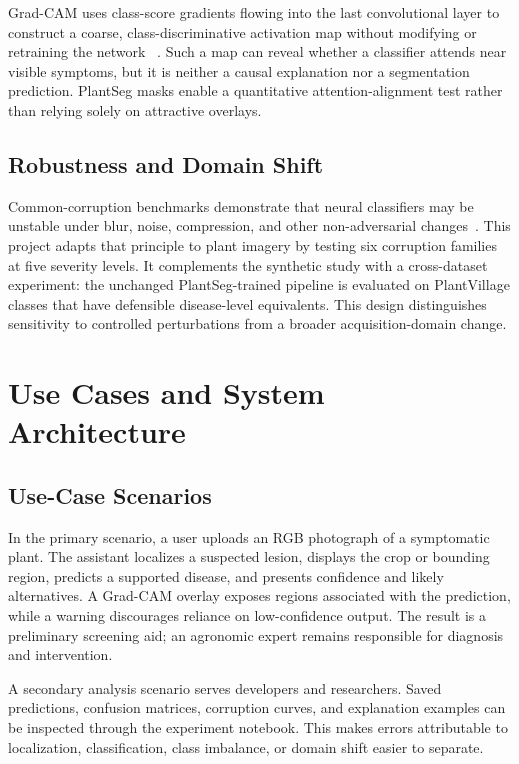 \documentclass[conference]{IEEEtran}
\begin{document}
Grad-CAM uses class-score gradients flowing into the last convolutional layer to construct a coarse,
class-discriminative activation map without modifying or retraining the network
~\cite{selvaraju2017gradcam}. Such a map can reveal whether a classifier attends near visible
symptoms, but it is neither a causal explanation nor a segmentation prediction. PlantSeg masks
enable a quantitative attention-alignment test rather than relying solely on attractive overlays.

\subsection{Robustness and Domain Shift}

Common-corruption benchmarks demonstrate that neural classifiers may be unstable under blur,
noise, compression, and other non-adversarial changes~\cite{hendrycks2019robustness}. This project
adapts that principle to plant imagery by testing six corruption families at five severity levels.
It complements the synthetic study with a cross-dataset experiment: the unchanged PlantSeg-trained
pipeline is evaluated on PlantVillage classes that have defensible disease-level equivalents. This
design distinguishes sensitivity to controlled perturbations from a broader acquisition-domain
change.

\section{Use Cases and System Architecture}

\subsection{Use-Case Scenarios}

In the primary scenario, a user uploads an RGB photograph of a symptomatic plant. The assistant
localizes a suspected lesion, displays the crop or bounding region, predicts a supported disease,
and presents confidence and likely alternatives. A Grad-CAM overlay exposes regions associated with
the prediction, while a warning discourages reliance on low-confidence output. The result is a
preliminary screening aid; an agronomic expert remains responsible for diagnosis and intervention.

A secondary analysis scenario serves developers and researchers. Saved predictions, confusion
matrices, corruption curves, and explanation examples can be inspected through the experiment
notebook. This makes errors attributable to localization, classification, class imbalance, or
domain shift easier to separate.
\end{document}
